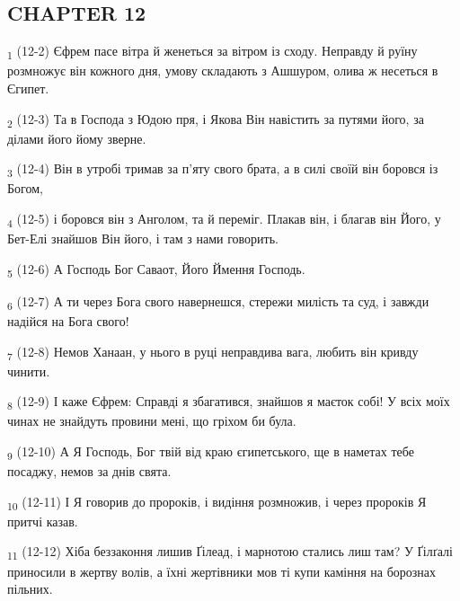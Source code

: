 \subsection{CHAPTER 12}
\begin{tcolorbox}
\textsubscript{1} (12-2) Єфрем пасе вітра й женеться за вітром із сходу. Неправду й руїну розмножує він кожного дня, умову складають з Ашшуром, олива ж несеться в Єгипет.
\end{tcolorbox}
\begin{tcolorbox}
\textsubscript{2} (12-3) Та в Господа з Юдою пря, і Якова Він навістить за путями його, за ділами його йому зверне.
\end{tcolorbox}
\begin{tcolorbox}
\textsubscript{3} (12-4) Він в утробі тримав за п'яту свого брата, а в силі своїй він боровся із Богом,
\end{tcolorbox}
\begin{tcolorbox}
\textsubscript{4} (12-5) і боровся він з Анголом, та й переміг. Плакав він, і благав він Його, у Бет-Елі знайшов Він його, і там з нами говорить.
\end{tcolorbox}
\begin{tcolorbox}
\textsubscript{5} (12-6) А Господь Бог Саваот, Його Ймення Господь.
\end{tcolorbox}
\begin{tcolorbox}
\textsubscript{6} (12-7) А ти через Бога свого навернешся, стережи милість та суд, і завжди надійся на Бога свого!
\end{tcolorbox}
\begin{tcolorbox}
\textsubscript{7} (12-8) Немов Ханаан, у нього в руці неправдива вага, любить він кривду чинити.
\end{tcolorbox}
\begin{tcolorbox}
\textsubscript{8} (12-9) І каже Єфрем: Справді я збагатився, знайшов я маєток собі! У всіх моїх чинах не знайдуть провини мені, що гріхом би була.
\end{tcolorbox}
\begin{tcolorbox}
\textsubscript{9} (12-10) А Я Господь, Бог твій від краю єгипетського, ще в наметах тебе посаджу, немов за днів свята.
\end{tcolorbox}
\begin{tcolorbox}
\textsubscript{10} (12-11) І Я говорив до пророків, і видіння розмножив, і через пророків Я притчі казав.
\end{tcolorbox}
\begin{tcolorbox}
\textsubscript{11} (12-12) Хіба беззаконня лишив Ґілеад, і марнотою стались лиш там? У Ґілґалі приносили в жертву волів, а їхні жертівники мов ті купи каміння на борознах пільних.
\end{tcolorbox}
